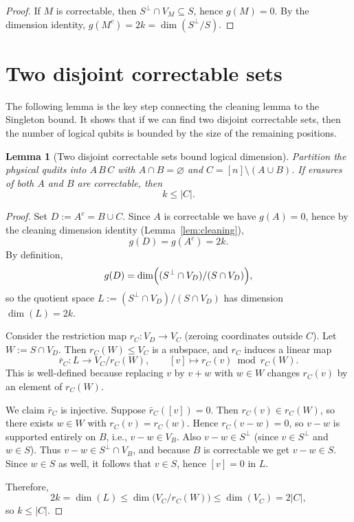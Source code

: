 \documentclass[11pt]{article}
\theoremstyle{plain}
\newtheorem{lemma}{Lemma}
\theoremstyle{definition}
\begin{document}
\begin{proof}
If $M$ is correctable, then $S^\perp \cap V_M \subseteq S$, hence $g(M) = 0$.  By the
dimension identity, $g(M^c) = 2k = \dim(S^\perp / S)$.
\end{proof}


\section{Two disjoint correctable sets}\label{sec:two-disjoint}

The following lemma is the key step connecting the cleaning lemma to the Singleton bound.  It
shows that if we can find two disjoint correctable sets, then the number of logical qubits is
bounded by the size of the remaining positions.

\begin{lemma}[Two disjoint correctable sets bound logical dimension]\label{lem:two-disjoint}
Partition the physical qudits into $A\, B\, C$ with $A \cap B = \varnothing$ and
$C = [n] \setminus (A \cup B)$.  If erasures of both $A$ and $B$ are correctable, then
\[
  k \le |C|.
\]
\end{lemma}

\begin{proof}
Set $D := A^c = B \cup C$.  Since $A$ is correctable we have $g(A) = 0$, hence by the
cleaning dimension identity (Lemma~\ref{lem:cleaning}),
\[
  g(D) = g(A^c) = 2k.
\]
By definition,
\[
  g(D) = \dim\Bigl( (S^\perp \cap V_D) / (S \cap V_D) \Bigr),
\]
so the quotient space $L := (S^\perp \cap V_D) / (S \cap V_D)$ has dimension $\dim(L) = 2k$.

Consider the restriction map $r_C : V_D \to V_C$ (zeroing coordinates outside $C$).  Let
$W := S \cap V_D$.  Then $r_C(W) \le V_C$ is a subspace, and $r_C$ induces a linear map
\[
  \bar{r}_C : L \longrightarrow V_C / r_C(W),
  \qquad [v] \longmapsto r_C(v) \bmod r_C(W).
\]
This is well-defined because replacing $v$ by $v + w$ with $w \in W$ changes $r_C(v)$ by an
element of $r_C(W)$.

We claim $\bar{r}_C$ is injective.  Suppose $\bar{r}_C([v]) = 0$.  Then
$r_C(v) \in r_C(W)$, so there exists $w \in W$ with $r_C(v) = r_C(w)$.  Hence
$r_C(v - w) = 0$, so $v - w$ is supported entirely on $B$, i.e.,
$v - w \in V_B$.  Also $v - w \in S^\perp$ (since $v \in S^\perp$ and $w \in S$).  Thus
$v - w \in S^\perp \cap V_B$, and because $B$ is correctable we get $v - w \in S$.  Since
$w \in S$ as well, it follows that $v \in S$, hence $[v] = 0$ in $L$.

Therefore,
\[
  2k = \dim(L) \le \dim\bigl( V_C / r_C(W) \bigr) \le \dim(V_C) = 2|C|,
\]
so $k \le |C|$.
\end{proof}
\end{document}
